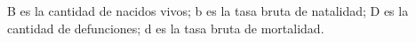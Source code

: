 \documentclass{article}
\theoremstyle{mytheoremstyle}
\theoremstyle{mytheoremstyle}
\theoremstyle{myproblemstyle}
\begin{document}
B es la cantidad de nacidos vivos;\newline
b es la tasa bruta de natalidad;\newline
D es la cantidad de defunciones;\newline
d es la tasa bruta de mortalidad.\newline
\end{document}
